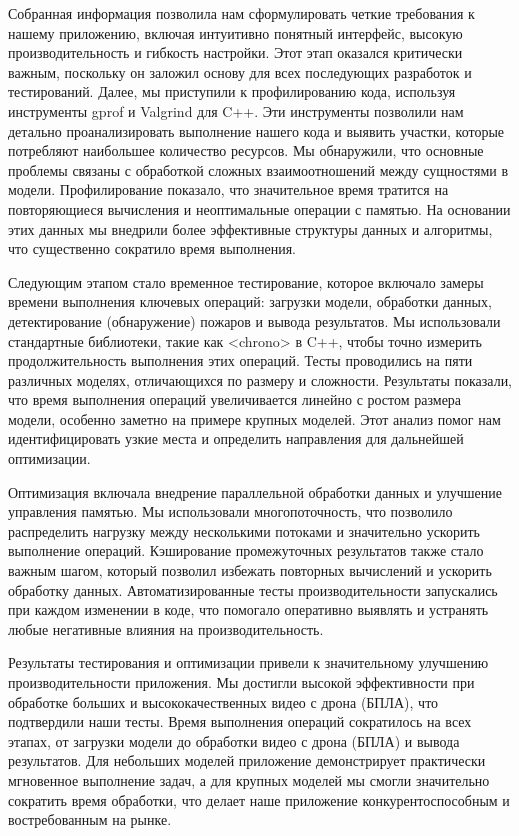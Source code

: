     Собранная информация позволила нам сформулировать четкие требования к нашему приложению, включая интуитивно понятный интерфейс, высокую производительность и гибкость настройки. Этот этап оказался критически важным, поскольку он заложил основу для всех последующих разработок и тестирований. Далее, мы приступили к профилированию кода, используя инструменты gprof и Valgrind для C++. Эти инструменты позволили нам детально проанализировать выполнение нашего кода и выявить участки, которые потребляют наибольшее количество ресурсов. Мы обнаружили, что основные проблемы связаны с обработкой сложных взаимоотношений между сущностями в модели. Профилирование показало, что значительное время тратится на повторяющиеся вычисления и неоптимальные операции с памятью. На основании этих данных мы внедрили более эффективные структуры данных и алгоритмы, что существенно сократило время выполнения.

    Следующим этапом стало временное тестирование, которое включало замеры времени выполнения ключевых операций: загрузки модели, обработки данных, детектирование (обнаружение) пожаров и вывода результатов. Мы использовали стандартные библиотеки, такие как <chrono> в C++, чтобы точно измерить продолжительность выполнения этих операций. Тесты проводились на пяти различных моделях, отличающихся по размеру и сложности. Результаты показали, что время выполнения операций увеличивается линейно с ростом размера модели, особенно заметно на примере крупных моделей. Этот анализ помог нам идентифицировать узкие места и определить направления для дальнейшей оптимизации.

    Оптимизация включала внедрение параллельной обработки данных и улучшение управления памятью. Мы использовали многопоточность, что позволило распределить нагрузку между несколькими потоками и значительно ускорить выполнение операций. Кэширование промежуточных результатов также стало важным шагом, который позволил избежать повторных вычислений и ускорить обработку данных. Автоматизированные тесты производительности запускались при каждом изменении в коде, что помогало оперативно выявлять и устранять любые негативные влияния на производительность.

    Результаты тестирования и оптимизации привели к значительному улучшению производительности приложения. Мы достигли высокой эффективности при обработке больших и высококачественных видео с дрона (БПЛА), что подтвердили наши тесты. Время выполнения операций сократилось на всех этапах, от загрузки модели до обработки видео с дрона (БПЛА) и вывода результатов. Для небольших моделей приложение демонстрирует практически мгновенное выполнение задач, а для крупных моделей мы смогли значительно сократить время обработки, что делает наше приложение конкурентоспособным и востребованным на рынке.
    
